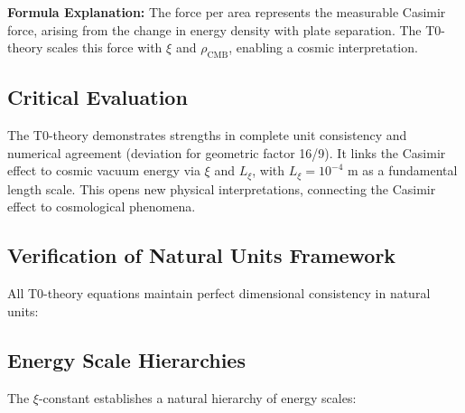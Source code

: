 \documentclass[12pt,a4paper]{report}
\begin{document}
	\textbf{Formula Explanation:} The force per area represents the measurable Casimir force, arising from the change in energy density with plate separation. The T0-theory scales this force with $\xi$ and $\rho_{\text{CMB}}$, enabling a cosmic interpretation.
	
	\subsection{Critical Evaluation}
	The T0-theory demonstrates strengths in complete unit consistency and numerical agreement (deviation for geometric factor 16/9). It links the Casimir effect to cosmic vacuum energy via $\xi$ and $L_\xi$, with $L_\xi = 10^{-4}$ m as a fundamental length scale. This opens new physical interpretations, connecting the Casimir effect to cosmological phenomena.
	
	\subsection{Verification of Natural Units Framework}
	
	All T0-theory equations maintain perfect dimensional consistency in natural units:
	
	\begin{table}[h]
		\centering
		\caption{Dimensional consistency in natural units}
	\end{table}
	
	\subsection{Energy Scale Hierarchies}
	
	The $\xi$-constant establishes a natural hierarchy of energy scales:
	
\end{document}
